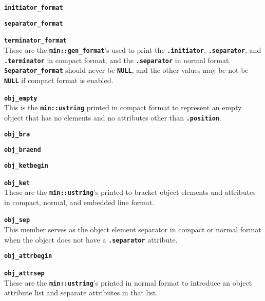 \documentclass[12pt]{article}
\makeatletter
\newcommand{\TT}[1]{{\tt \bfseries #1}}
\newcommand{\ttmkey}[2]{\TT{#1}\index{#1@{\tt #1}!#2}}
\newcommand{\EOL}{\penalty \exhyphenpenalty}
\newenvironment{itemlist}[1][1.2in]%
	{\begin{list}{}{\setlength{\labelwidth}{#1}%
		        \setlength{\leftmargin}{\labelwidth}%
		        \addtolength{\leftmargin}{+0.2in}%
		        \renewcommand{\makelabel}[1]{##1\hfill}}}%
	{\end{list}}
\makeatother
\begin{document}
\begin{itemlist}[0.2in]
\item[\ttmkey{initiator\_format}{in {\tt min::obj\_format}}]
\item[\ttmkey{separator\_format}{in {\tt min::obj\_format}}]\vspace{-2ex}
\item[\ttmkey{terminator\_format}{in {\tt min::obj\_format}}]\vspace{-2ex}~\\
These are the \TT{min::gen\_format}'s used to print the
\TT{.initiator}, \TT{.separator}, and \TT{.terminator} in compact
format, and the \TT{.separator} in normal format.
\TT{Separator\_\EOL format} should never be \TT{NULL}, and the
other values may be not be \TT{NULL} if compact
format is enabled.

\item[\ttmkey{obj\_empty}{in {\tt min::obj\_format}}]~\\
This is the \TT{min::ustring} printed in compact format
to represent an empty object that has no elements and no attributes
other than \TT{.position}.

\item[\ttmkey{obj\_bra}{in {\tt min::obj\_format}}]
\item[\ttmkey{obj\_braend}{in {\tt min::obj\_format}}]\vspace{-2ex}
\item[\ttmkey{obj\_ketbegin}{in {\tt min::obj\_format}}]\vspace{-2ex}
\item[\ttmkey{obj\_ket}{in {\tt min::obj\_format}}]\vspace{-2ex}~\\
These are the \TT{min::ustring}'s printed to bracket
object elements and attributes in compact, normal, and embedded line format.

\item[\ttmkey{obj\_sep}{in {\tt min::obj\_format}}]~\\
This member serves as the object element separator in compact
or normal format when the object does
not have a \TT{.separator} attribute.

\item[\ttmkey{obj\_attrbegin}{in {\tt min::obj\_format}}]
\item[\ttmkey{obj\_attrsep}{in {\tt min::obj\_format}}]\vspace{-2ex}~\\
These are the \TT{min::ustring}'s printed in normal format to introduce
an object attribute list and separate attributes in that list.


\end{itemlist}
\end{document}
